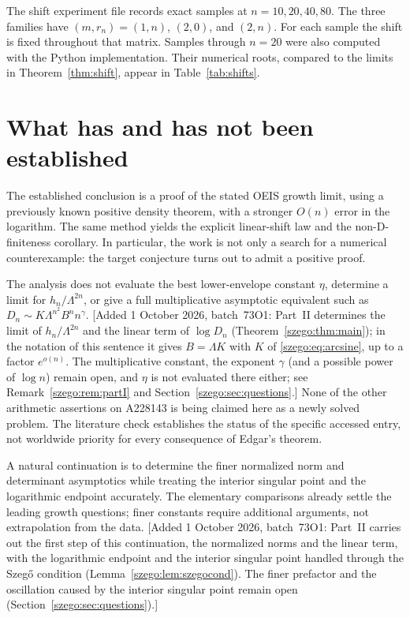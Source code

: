 \documentclass[11pt,a4paper]{article}
\numberwithin{equation}{section}
\theoremstyle{remark}\newtheorem{remark}[theorem]{Remark}
\begin{document}
The shift experiment file records exact samples at $n=10,20,40,80$.
The three families have $(m,r_n)=(1,n)$, $(2,0)$, and $(2,n)$. For each sample the shift is fixed throughout
that matrix. Samples through $n=20$ were also computed with the Python
implementation. Their numerical roots, compared to the limits in
Theorem~\ref{thm:shift}, appear in Table~\ref{tab:shifts}.


\section{What has and has not been established}
The established conclusion is a proof of the stated OEIS growth limit, using
a previously known positive density theorem, with a stronger $O(n)$ error
in the logarithm. The same method yields the explicit linear-shift law and
the non-D-finiteness corollary. In particular, the work is not only a search
for a numerical counterexample: the target conjecture turns out to admit a
positive proof.

The analysis does not evaluate the best lower-envelope constant $\eta$,
determine a limit for $h_n/\Lambda^{2n}$, or give a full multiplicative
asymptotic equivalent such as $D_n\sim K\Lambda^{n^2}B^n n^\gamma$.
[Added 1 October 2026, batch~73O1: Part~II determines the limit of
$h_n/\Lambda^{2n}$ and the linear term of $\log D_n$
(Theorem~\ref{szego:thm:main}); in the notation of this sentence it gives
$B=\Lambda K$ with $K$ of \eqref{szego:eq:arcsine}, up to a factor
$e^{o(n)}$. The multiplicative constant, the exponent $\gamma$ (and a
possible power of $\log n$) remain open, and $\eta$ is not evaluated there
either; see Remark~\ref{szego:rem:partI} and
Section~\ref{szego:sec:questions}.]
None of the other arithmetic assertions on A228143 is being claimed here as
a newly solved problem. The literature check establishes the status of the
specific accessed entry, not worldwide priority for every consequence of
Edgar's theorem.

A natural continuation is to determine the finer normalized norm and
determinant asymptotics while treating the interior singular point and the
logarithmic endpoint accurately. The elementary comparisons already settle
the leading growth questions; finer constants require additional arguments,
not extrapolation from the data.
[Added 1 October 2026, batch~73O1: Part~II carries out the first step of this
continuation, the normalized norms and the linear term, with the
logarithmic endpoint and the interior singular point handled through the
Szeg\H{o} condition (Lemma~\ref{szego:lem:szegocond}). The finer prefactor
and the oscillation caused by the interior singular point remain open
(Section~\ref{szego:sec:questions}).]
\end{document}
